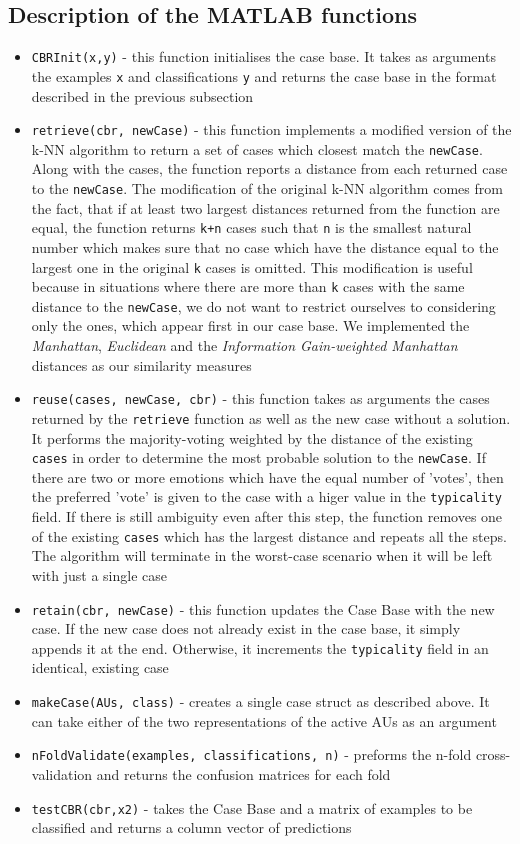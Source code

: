 \documentclass[a4paper]{article}
\begin{document}
\subsection{Description of the MATLAB functions}
\begin{itemize}
\item \texttt{CBRInit(x,y)} - this function initialises the case base. It takes as arguments the examples \texttt{x} and classifications \texttt{y} and returns the case base in the format described in the previous subsection
\item \texttt{retrieve(cbr, newCase)} - this function implements a modified version of the k-NN algorithm to return a set of cases which closest match the \texttt{newCase}. Along with the cases, the function reports a distance from each returned case to the \texttt{newCase}. The modification of the original k-NN algorithm comes from the fact, that if at least two largest distances returned from the function are equal, the function returns \texttt{k+n} cases such that \texttt{n} is the smallest natural number which makes sure that no case which have the distance equal to the largest one in the original \texttt{k} cases is omitted. This modification is useful because in situations where there are more than \texttt{k} cases with the same distance to the \texttt{newCase}, we do not want to restrict ourselves to considering only the ones, which appear first in our case base. We implemented the \emph{Manhattan}, \emph{Euclidean} and the \emph{Information Gain-weighted Manhattan} distances as our similarity measures
\item \texttt{reuse(cases, newCase, cbr)} - this function takes as arguments the cases returned by the \texttt{retrieve} function as well as the new case without a solution. It performs the majority-voting weighted by the distance of the existing \texttt{cases} in order to determine the most probable solution to the \texttt{newCase}. If there are two or more emotions which have the equal number of 'votes', then the preferred 'vote' is given to the case with a higer value in the \texttt{typicality} field. If there is still ambiguity even after this step, the function removes one of the existing \texttt{cases} which has the largest distance and repeats all the steps. The algorithm will terminate in the worst-case scenario when it will be left with just a single case
\item \texttt{retain(cbr, newCase)} - this function updates the Case Base with the new case. If the new case does not already exist in the case base, it simply appends it at the end. Otherwise, it increments the \texttt{typicality} field in an identical, existing case
\item \texttt{makeCase(AUs, class)} - creates a single case struct as described above. It can take either of the two representations of the active AUs as an argument
\item \texttt{nFoldValidate(examples, classifications, n)} - preforms the n-fold cross-validation and returns the confusion matrices for each fold
\item \texttt{testCBR(cbr,x2)} - takes the Case Base and a matrix of examples to be classified and returns a column vector of predictions
\end{itemize}
\clearpage
\end{document}
